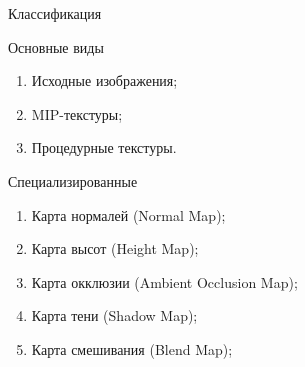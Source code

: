 \documentclass{beamer}
\begin{document}
	\begin{frame}{Классификация}

		Основные виды
		\begin{enumerate}
			\item Исходные изображения;
			\item MIP-текстуры;
			\item Процедурные текстуры. %
		\end{enumerate}
		
		Специализированные
		\begin{enumerate}
			\item Карта нормалей (Normal Map);
			\item Карта высот (Height Map);
			
			\item Карта окклюзии (Ambient Occlusion Map);
			\item Карта тени (Shadow Map);
		
			\item Карта смешивания (Blend Map);
		\end{enumerate}

	\end{frame}
\end{document}
